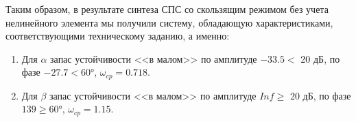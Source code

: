 Таким образом, в результате синтеза СПС со скользящим режимом без учета нелинейного элемента мы получили систему, обладающую характеристиками, соответствующими техническому заданию, а именно:
\begin{enumerate}
\item 
Для $\alpha$ запас устойчивости <<в малом>> по амплитуде $-33.5<$ 20 дБ, по фазе $-27.7< 60°$, $\omega_{cp}=0.718$. 
\item 
Для $\beta$ запас устойчивости <<в малом>> по амплитуде $Inf\ge$ 20 дБ, по фазе $139\ge 60°$, $\omega_{cp}=1.15$. 
\end{enumerate}
